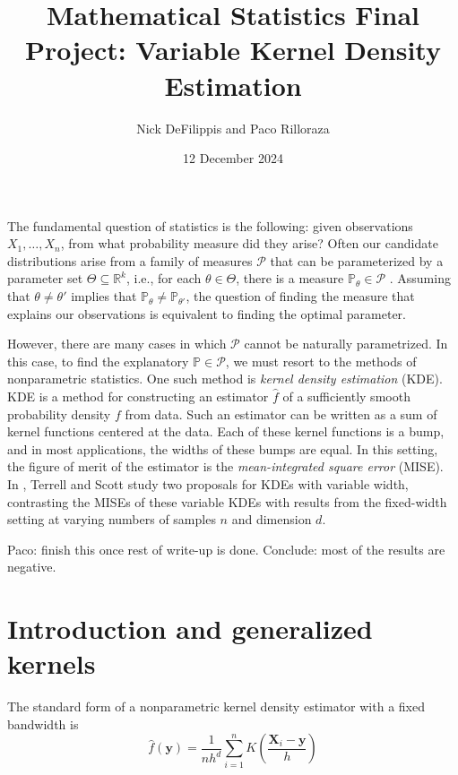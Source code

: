 \documentclass{article}
\title{Mathematical Statistics Final Project: Variable Kernel Density Estimation}
\author{Nick DeFilippis and Paco Rilloraza}
\date{12 December 2024}
\newcommand{\R}{\mathbb{R}}
\begin{document}
\maketitle

The fundamental question of statistics is the following: given observations $X_1, \dots, X_n$, from what probability measure did they arise? Often our candidate distributions arise from a family of measures $\mathcal{P}$ that can be parameterized by a parameter set $\Theta \subseteq \R^k$, i.e., for each $\theta \in \Theta$, there is a measure $\mathbb{P}_\theta \in \mathcal{P}$ \cite{jnw}. Assuming that $\theta \neq \theta'$ implies that $\mathbb{P}_\theta \neq \mathbb{P}_{\theta'}$, the question of finding the measure that explains our observations is equivalent to finding the optimal parameter. 

However, there are many cases in which $\mathcal{P}$ cannot be naturally parametrized. In this case, to find the explanatory $\mathbb{P} \in \mathcal{P}$, we must resort to the methods of nonparametric statistics. One such method is \textit{kernel density estimation} (KDE). KDE is a method for constructing an estimator $\hat{f}$ of a sufficiently smooth probability density $f$ from data. Such an estimator can be written as a sum of kernel functions centered at the data. Each of these kernel functions is a bump, and in most applications, the widths of these bumps are equal. In this setting, the figure of merit of the estimator is the \textit{mean-integrated square error} (MISE). In \cite{vkde}, Terrell and Scott study two proposals for KDEs with variable width, contrasting the MISEs of these variable KDEs with results from the fixed-width setting at varying numbers of samples $n$ and dimension $d$. 

{\color{blue} Paco: finish this once rest of write-up is done. Conclude: most of the results are negative.}

\section{Introduction and generalized kernels}

The standard form of a nonparametric kernel density estimator with a fixed bandwidth is
\begin{equation}\label{eq:fixed-width-kde}
    \hat{f}(\mathbf{y}) = \frac{1}{nh^d}\sum_{i=1}^nK\left(\frac{\mathbf{X}_i-\mathbf{y}}{h}\right)
\end{equation}
\end{document}
